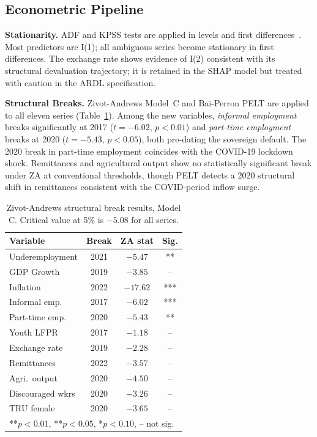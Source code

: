 \documentclass[sigconf]{acmart}
\begin{document}

\subsection{Econometric Pipeline}

\textbf{Stationarity.} ADF and KPSS tests are applied in levels and first
differences~\cite{kpss1992}. Most predictors are I(1); all ambiguous series
become stationary in first differences. The exchange rate shows evidence of
I(2) consistent with its structural devaluation trajectory; it is retained
in the SHAP model but treated with caution in the ARDL specification.

\textbf{Structural Breaks.} Zivot-Andrews Model~C and Bai-Perron PELT are
applied to all eleven series (Table~\ref{tab:za}). Among the new
variables, \emph{informal employment} breaks significantly at 2017
($t{=}{-6.02}$, $p{<}0.01$) and \emph{part-time employment} breaks at 2020
($t{=}{-5.43}$, $p{<}0.05$), both pre-dating the sovereign default. The
2020 break in part-time employment coincides with the COVID-19 lockdown
shock. Remittances and agricultural output show no statistically significant
break under ZA at conventional thresholds, though PELT detects a 2020
structural shift in remittances consistent with the COVID-period inflow surge.

\begin{table}[h]
\caption{Zivot-Andrews structural break results, Model C. Critical value
  at 5\% is $-5.08$ for all series.}
\label{tab:za}
\setlength{\tabcolsep}{3pt}
\footnotesize
\begin{tabular}{lccc}
\toprule
\textbf{Variable} & \textbf{Break} & \textbf{ZA stat} & \textbf{Sig.}\\
\midrule
Underemployment   & 2021 & $-5.47$  & **  \\
GDP Growth        & 2019 & $-3.85$  & --  \\
Inflation         & 2022 & $-17.62$ & *** \\
Informal emp.     & 2017 & $-6.02$  & *** \\
Part-time emp.    & 2020 & $-5.43$  & **  \\
Youth LFPR        & 2017 & $-1.18$  & --  \\
Exchange rate     & 2019 & $-2.28$  & --  \\
Remittances       & 2022 & $-3.57$  & --  \\
Agri.\ output     & 2020 & $-4.50$  & --  \\
Discouraged wkrs  & 2020 & $-3.26$  & --  \\
TRU female        & 2020 & $-3.65$  & --  \\
\midrule
\multicolumn{4}{l}{\scriptsize ***$p{<}0.01$, **$p{<}0.05$, *$p{<}0.10$, -- not sig.}\\
\bottomrule
\end{tabular}
\end{table}
\end{document}
